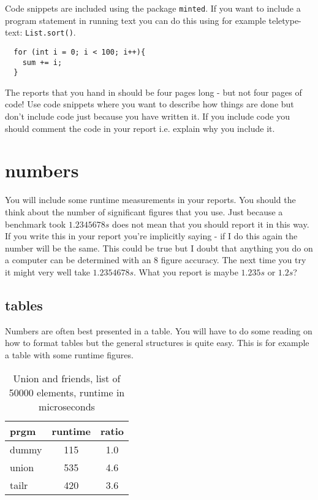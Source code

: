 \documentclass[a4paper,11pt]{article}
\begin{document}
Code snippets are included using the package {\tt minted}. If you
want to include a program statement in running text you can do this
using for example teletype-text: {\tt List.sort()}.

\begin{verbatim}
  for (int i = 0; i < 100; i++){
    sum += i;
  }
\end{verbatim}

The reports that you hand in should be four pages long - but not four
pages of code! Use code snippets where you want to describe how things
are done but don't include code just because you have written it. If
you include code you should comment the code in your report
i.e. explain why you include it.

\section*{numbers}

You will include some runtime measurements in your reports. You
should the think about the number of significant figures that you
use. Just because a benchmark took $1.2345678 s$ does not mean that
you should report it in this way. If you write this in your report
you're implicitly saying - if I do this again the number will be the
same. This could be true but I doubt that anything you do on a
computer can be determined with an 8 figure accuracy. The next time
you try it might very well take $1.2354678 s$. What you report is
maybe $1.235 s$ or $1.2 s$?

\subsection*{tables}

Numbers are often best presented in a table. You will have to do some
reading on how to format tables but the general structures is quite
easy. This is for example a table with some runtime figures.

\begin{table}[h]
\begin{center}
\begin{tabular}{l|c|c}
\textbf{prgm} & \textbf{runtime} & \textbf{ratio}\\
\hline
  dummy      &  115 &     1.0\\
  union      &  535 &     4.6\\
  tailr      &  420 &     3.6\\
\end{tabular}
\caption{Union and friends, list of 50000 elements, runtime in microseconds}
\label{tab:table1}
\end{center}
\end{table}
\end{document}
